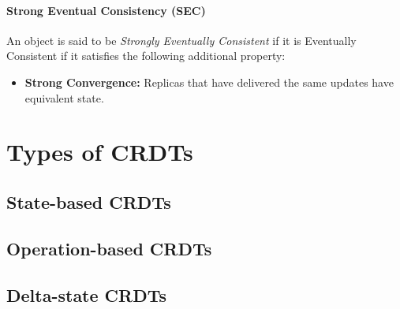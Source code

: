 \paragraph{Strong Eventual Consistency (SEC)} An object is said to be \textit{Strongly Eventually Consistent} if it
is Eventually Consistent if it satisfies the following additional property:
\begin{itemize}
    \item \textbf{Strong Convergence:} Replicas that have delivered the same updates have equivalent state.
\end{itemize}

\section{Types of CRDTs}

\subsection{State-based CRDTs}

\subsection{Operation-based CRDTs}

\subsection{Delta-state CRDTs}